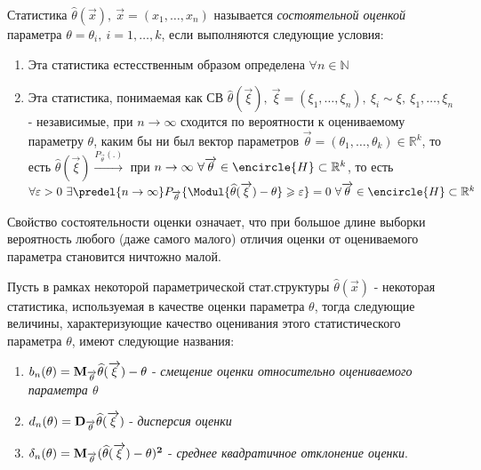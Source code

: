 \begin{defs}[Состоятельность]
  Статистика $\widehat{\theta}(\overrightarrow{x}), \ \overrightarrow{x}=(x_1,\ldots,x_n)$ называется
  \textit{состоятельной оценкой} параметра $\theta = \theta_i, \ i=1,\ldots,k$, если выполняются
  следующие условия:
  \begin{enumerate}
      \item Эта статистика естесственным образом определена $\forall n \in \mathbb{N}$
      \item Эта статистика, понимаемая как СВ $\widehat{\theta}(\overrightarrow{\xi}), \
      \overrightarrow{\xi} = (\xi_1,\ldots,\xi_n), \ \xi_i \sim \xi, \ \xi_1,\ldots,\xi_n$ - независимые,
      при $n \to \infty$ сходится по вероятности к оцениваемому параметру $\theta$, каким бы ни был вектор параметров
      $\overrightarrow{\theta}=(\theta_1,\ldots,\theta_k) \in \mathbb{R}^k$, то есть
      $\widehat{\theta}(\overrightarrow{\xi}) \xrightarrow[]{P_{\overrightarrow{\theta}}(.)}$ при $n \to \infty \
      \forall \overrightarrow{\theta} \in \encircle{H} \subset \mathbb{R}^k$, то есть
      $\forall \varepsilon > 0 \ \exists \predel{n \to \infty}P_{\overrightarrow{\theta}}\{\Modul{\widehat{\theta}(\overrightarrow{\xi}) - \theta}
      \geqslant \varepsilon\}=0 \ \forall \overrightarrow{\theta} \in \encircle{H} \subset \mathbb{R}^k$
  \end{enumerate}
\end{defs}

Свойство состоятельности оценки означает, что при большое длине выборки вероятность любого
(даже самого малого) отличия оценки от оцениваемого параметра становится ничтожно малой.

\begin{defs}[]
  Пусть в рамках некоторой параметрической стат.структуры
   $\widehat{\theta}(\overrightarrow{x})$ - некоторая статистика, используемая в качестве
  оценки параметра $\theta$, тогда следующие величины, характеризующие качество
  оценивания этого статистического параметра $\theta$, имеют следующие названия:
  \begin{enumerate}
      \item $b_n(\theta) = \bf{M}_{\overrightarrow{\theta}}\widehat{\theta}(\overrightarrow{\xi}) - \theta$ -
      \textit{смещение оценки относительно оцениваемого параметра $\theta$}
      \item $d_n(\theta) = \bf{D}_{\overrightarrow{\theta}}\widehat{\theta}(\overrightarrow{\xi})$ - \textit{дисперсия оценки}
      \item $\delta_n(\theta) = \bf{M}_{\overrightarrow{\theta}}(\widehat{\theta}(\overrightarrow{\xi}) - \theta)^2$ -
      \textit{среднее квадратичное отклонение оценки}.
  \end{enumerate}
\end{defs}

